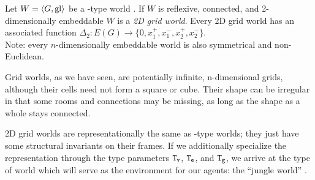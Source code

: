 \begin{definition}
	Let $W = \langle G,\mathrm{gl} \rangle$ be a \wext-type world . If $W$ is reflexive, connected, and 2-dimensionally embeddable $W$ is a {\em 2D grid world}.
	Every 2D grid world has an associated function $\Delta_2 : E(G) \rightarrow \{0,x_1^+,x_1^-,x_2^+,x_2^- \}$.\\
	Note: every $n$-dimensionally embeddable world is also symmetrical and non-Euclidean.
\end{definition}

Grid worlds, as we have seen, are potentially infinite, n-dimensional grids, although their cells need not form a square or cube. Their shape can be irregular in that some rooms and connections may be missing, as long as the shape as a whole stays connected.

2D grid worlds are representationally the same as \wext-type worlds; they just have some structural invariants on their frames. If we additionally specialize the representation through the type parameters $\mathtt{T_v}$, $\mathtt{T_e}$, and $\mathtt{T_g}$, we arrive at the type of world which will serve as the environment for our agents: the ``jungle world'' \wjun.

